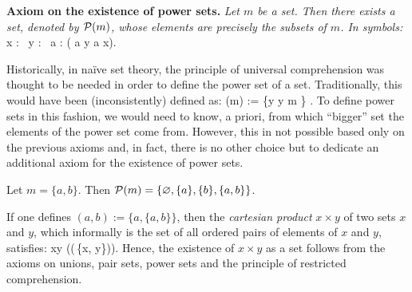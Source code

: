 \textbf{Axiom on the existence of power sets.} \emph{Let $m$ be a set. Then there exists a set, denoted by $\mathcal{P}(m)$, whose elements are precisely the subsets of $m$. In symbols:}
\bse
\forall \, x : \exists \, y : \forall \, a : ( a \in y \eqv a \se x).
\ese

Historically, in na\"ive set theory, the principle of universal comprehension was thought to be needed in order to define the power set of a set. Traditionally, this would have been (inconsistently) defined as:
\bse
\cP (m) := \{y \mid y \se m \} .
\ese
To define power sets in this fashion, we would need to know, a priori, from which ``bigger'' set the elements of the power set come from. However, this in not possible based only on the previous axioms and, in fact, there is no other choice but to dedicate an additional axiom for the existence of power sets.

\be
Let $m = \{a,b\}$. Then $\mathcal{P}(m)=\{\varnothing,\{a\},\{b\},\{a,b\}\}$.
\ee

\br
If one defines $(a,b) := \{a,\{a,b\}\}$, then the \emph{cartesian product} $x \times y$ of two sets $x$ and $y$, which informally is the set of all ordered pairs of elements of $x$ and $y$, satisfies:
\bse
x\times y \se \cP(\cP(\bigcup\,\{x, y\})).
\ese
Hence, the existence of $x\times y$ as a set follows from the axioms on unions, pair sets, power sets and the principle of restricted comprehension.
\er

